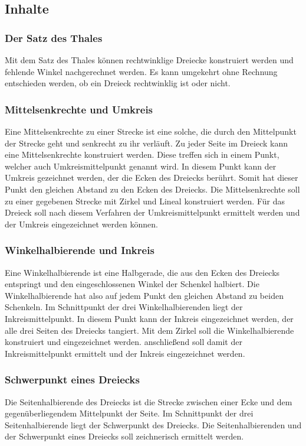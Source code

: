 \documentclass{article}
\begin{document}
\subsection{Inhalte}
\subsubsection*{Der Satz des Thales}
Mit dem Satz des Thales können rechtwinklige Dreiecke konstruiert werden und fehlende Winkel nachgerechnet werden. Es kann umgekehrt ohne Rechnung entschieden werden, ob ein Dreieck rechtwinklig ist oder nicht.
\subsubsection*{Mittelsenkrechte und Umkreis}
Eine Mittelsenkrechte zu einer Strecke ist eine solche, die durch den Mittelpunkt der Strecke geht und senkrecht zu ihr verläuft.
Zu jeder Seite im Dreieck kann eine Mittelsenkrechte konstruiert werden. Diese treffen sich in einem Punkt, welcher auch Umkreismittelpunkt genannt wird.
In diesem Punkt kann der Umkreis gezeichnet werden, der die Ecken des Dreiecks berührt. Somit hat dieser Punkt den gleichen Abstand zu den Ecken des Dreiecks.
Die Mittelsenkrechte soll zu einer gegebenen Strecke mit Zirkel und Lineal konstruiert werden. Für das Dreieck soll nach diesem Verfahren der Umkreismittelpunkt ermittelt werden und der Umkreis eingezeichnet werden können.
\subsubsection*{Winkelhalbierende und Inkreis}
Eine Winkelhalbierende ist eine Halbgerade, die aus den Ecken des Dreiecks entspringt und den eingeschlossenen Winkel der Schenkel halbiert. Die Winkelhalbierende hat also auf jedem Punkt den gleichen Abstand zu beiden Schenkeln.
Im Schnittpunkt der drei Winkelhalbierenden liegt der Inkreismittelpunkt. In diesem Punkt kann der Inkreis eingezeichnet werden, der alle drei Seiten des Dreiecks tangiert.
Mit dem Zirkel soll die Winkelhalbierende konstruiert und eingezeichnet werden. anschließend soll damit der Inkreismittelpunkt ermittelt und der Inkreis eingezeichnet werden.
\subsubsection*{Schwerpunkt eines Dreiecks}
Die Seitenhalbierende des Dreiecks ist die Strecke zwischen einer Ecke und dem gegenüberliegendem Mittelpunkt der Seite. Im Schnittpunkt der drei Seitenhalbierende liegt der Schwerpunkt des Dreiecks.
Die Seitenhalbierenden und der Schwerpunkt eines Dreiecks soll zeichnerisch ermittelt werden.
\end{document}
